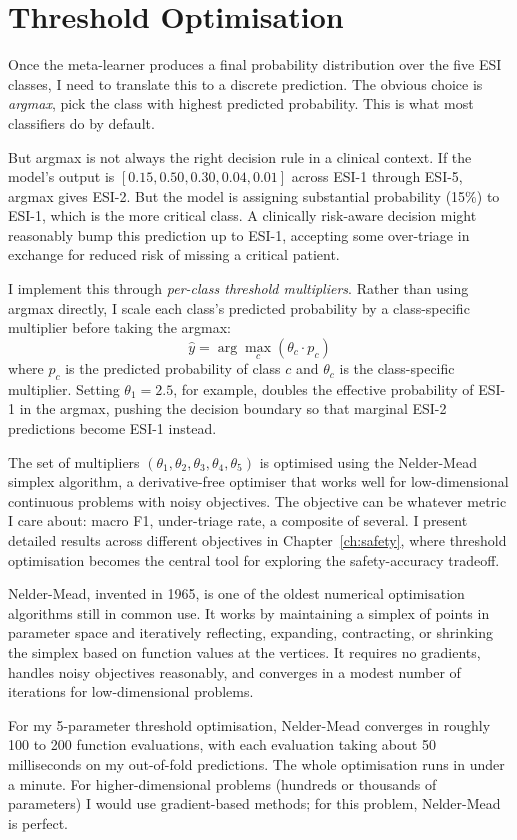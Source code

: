 \section{Threshold Optimisation}

Once the meta-learner produces a final probability distribution over the five ESI classes, I need to translate this to a discrete prediction. The obvious choice is \emph{argmax}, pick the class with highest predicted probability. This is what most classifiers do by default.

But argmax is not always the right decision rule in a clinical context. If the model's output is $[0.15, 0.50, 0.30, 0.04, 0.01]$ across ESI-1 through ESI-5, argmax gives ESI-2. But the model is assigning substantial probability (15\%) to ESI-1, which is the more critical class. A clinically risk-aware decision might reasonably bump this prediction up to ESI-1, accepting some over-triage in exchange for reduced risk of missing a critical patient.

I implement this through \emph{per-class threshold multipliers}. Rather than using argmax directly, I scale each class's predicted probability by a class-specific multiplier before taking the argmax:
\[
\hat{y} = \arg\max_c (\theta_c \cdot p_c)
\]
where $p_c$ is the predicted probability of class $c$ and $\theta_c$ is the class-specific multiplier. Setting $\theta_1 = 2.5$, for example, doubles the effective probability of ESI-1 in the argmax, pushing the decision boundary so that marginal ESI-2 predictions become ESI-1 instead.

The set of multipliers $(\theta_1, \theta_2, \theta_3, \theta_4, \theta_5)$ is optimised using the Nelder-Mead simplex algorithm, a derivative-free optimiser that works well for low-dimensional continuous problems with noisy objectives. The objective can be whatever metric I care about: macro F1, under-triage rate, a composite of several. I present detailed results across different objectives in Chapter~\ref{ch:safety}, where threshold optimisation becomes the central tool for exploring the safety-accuracy tradeoff.

\begin{notebox}
Nelder-Mead, invented in 1965, is one of the oldest numerical optimisation algorithms still in common use. It works by maintaining a simplex of points in parameter space and iteratively reflecting, expanding, contracting, or shrinking the simplex based on function values at the vertices. It requires no gradients, handles noisy objectives reasonably, and converges in a modest number of iterations for low-dimensional problems.

For my 5-parameter threshold optimisation, Nelder-Mead converges in roughly 100 to 200 function evaluations, with each evaluation taking about 50 milliseconds on my out-of-fold predictions. The whole optimisation runs in under a minute. For higher-dimensional problems (hundreds or thousands of parameters) I would use gradient-based methods; for this problem, Nelder-Mead is perfect.
\end{notebox}

